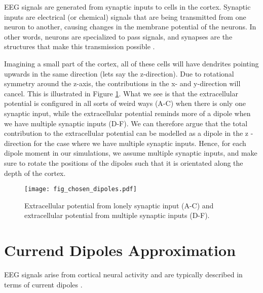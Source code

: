 \documentclass[a4paper, UKenglish, 11pt]{uiomaster}
\begin{document}
EEG signals are generated from synaptic inputs to cells in the cortex. Synaptic inputs are electrical (or chemical) signals that are being transmitted from one neuron to another, causing changes in the membrane potential of the neurons. In other words, neurons are specialized to pass signals, and synapses are the structures that make this transmission possible \cite{105}.

Imagining a small part of the cortex, all of these cells will have dendrites pointing upwards in the same direction (lets say the z-direction). Due to rotational symmetry around the z-axis, the contributions in the x- and y-direction will cancel. This is illustrated in Figure \ref{fig:EP}. What we see is that the extracellular potential is configured in all sorts of weird ways (A-C) when there is only one synaptic input, while the extracellular potential reminds more of a dipole when we have multiple synaptic inputs (D-F). We can therefore argue that the total contribution to the extracellular potential can be modelled as a dipole in the z -direction for the case where we have multiple synaptic inputs. Hence, for each dipole moment in our simulations, we assume multiple synaptic inputs, and make sure to rotate the positions of the dipoles such that it is orientated along the depth of the cortex.


\begin{figure}[H]
    \centering
    \texttt{[image: fig\_chosen\_dipoles.pdf]}
    \caption{Extracellular potential from lonely synaptic input (A-C) and extracellular potential from multiple synaptic inputs (D-F).}
    \label{fig:EP}
\end{figure}


\section{Currend Dipoles Approximation}
EEG signals arise from cortical neural activity and are typically described in terms of current dipoles \cite{95}.
\end{document}
